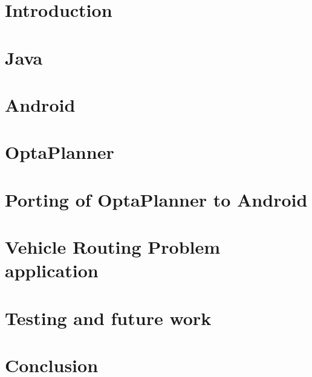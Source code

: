 \chapter{Introduction}\label{IntroductionChapter}


\chapter{Java}\label{JavaChapter}


\chapter{Android}\label{AndroidChapter}


\chapter{OptaPlanner}\label{OptaPlannerChapter}


\chapter{Porting of OptaPlanner to Android}\label{PortingChapter}


\chapter{Vehicle Routing Problem application}\label{ApplicationChapter}


\chapter{Testing and future work}\label{TestingChapter}


\chapter{Conclusion}\label{ConclusionChapter}

